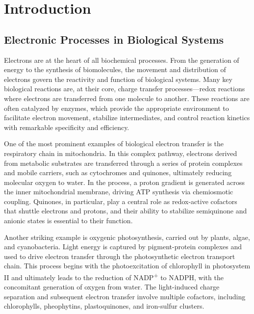 \chapter{Introduction}\label{ch:introduction}


\section{Electronic Processes in Biological Systems}

Electrons are at the heart of all biochemical processes. From the generation of energy to the synthesis of biomolecules, the movement and distribution of electrons govern the reactivity and function of biological systems. Many key biological reactions are, at their core, charge transfer processes—redox reactions where electrons are transferred from one molecule to another. These reactions are often catalyzed by enzymes, which provide the appropriate environment to facilitate electron movement, stabilize intermediates, and control reaction kinetics with remarkable specificity and efficiency.

One of the most prominent examples of biological electron transfer is the respiratory chain in mitochondria. In this complex pathway, electrons derived from metabolic substrates are transferred through a series of protein complexes and mobile carriers, such as cytochromes and quinones, ultimately reducing molecular oxygen to water. In the process, a proton gradient is generated across the inner mitochondrial membrane, driving ATP synthesis via chemiosmotic coupling. Quinones, in particular, play a central role as redox-active cofactors that shuttle electrons and protons, and their ability to stabilize semiquinone and anionic states is essential to their function.

Another striking example is oxygenic photosynthesis, carried out by plants, algae, and cyanobacteria. Light energy is captured by pigment-protein complexes and used to drive electron transfer through the photosynthetic electron transport chain. This process begins with the photoexcitation of chlorophyll in photosystem II and ultimately leads to the reduction of NADP\textsuperscript{+} to NADPH, with the concomitant generation of oxygen from water. The light-induced charge separation and subsequent electron transfer involve multiple cofactors, including chlorophylls, pheophytins, plastoquinones, and iron-sulfur clusters.

